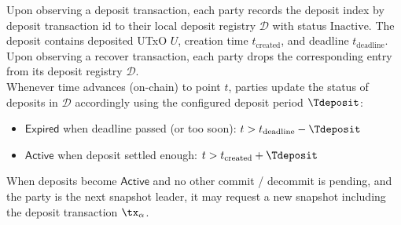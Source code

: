 \quad Upon observing a deposit transaction,
each party records the deposit index by deposit transaction id to their local
deposit registry $\mathcal{D}$ with status $\text{Inactive}$. The deposit
contains deposited UTxO $U$, creation time $t_{\text{created}}$, and deadline
$t_{\text{deadline}}$. \\

\quad Upon observing a recover transaction,
each party drops the corresponding entry from its deposit registry
$\mathcal{D}$. \\

\quad Whenever time advances (on-chain) to point
$t$, parties update the status of deposits in $\mathcal{D}$ accordingly using
the configured deposit period $\Tdeposit$:
\begin{itemize}
  \item $\mathsf{Expired}$ when deadline passed (or too soon): $t > t_{\text{deadline}} - \Tdeposit$
  \item $\mathsf{Active}$ when deposit settled enough: $t > t_{\text{created}} + \Tdeposit$
\end{itemize}
When deposits become $\mathsf{Active}$ and no other commit / decommit is
pending, and the party is the next snapshot leader, it may request a new
snapshot including the deposit transaction $\tx_{\alpha}$. \\

